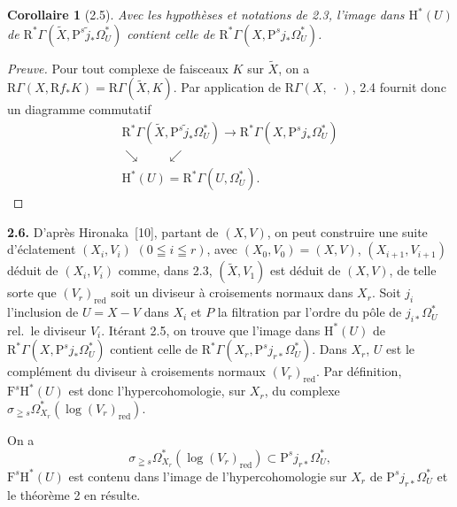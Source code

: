 \documentclass[12pt,a4paper]{article}
\theoremstyle{plain}
\newtheorem{corollary}[theorem]{Corollaire}
\theoremstyle{definition}
\begin{document}
\begin{corollary}[2.5]
Avec les hypothèses et notations de \emph{2.3}, l'image dans $\mathrm{H}^*(U)$ de $\mathrm{R}^*\Gamma(\tilde{X}, \mathrm{P}^s \tilde{j}_* \Omega_U^*)$ contient celle de $\mathrm{R}^*\Gamma(X, \mathrm{P}^s j_* \Omega_U^*)$.
\end{corollary}

\begin{proof}[Preuve]
Pour tout complexe de faisceaux $K$ sur $\tilde{X}$, on a $\mathrm{R}\Gamma(X, \mathrm{R}f_* K) = \mathrm{R}\Gamma(\tilde{X}, K)$. Par application de $\mathrm{R}\Gamma(X, \ \cdot\ )$, 2.4 fournit donc un diagramme commutatif
\[
\begin{array}{c}
\mathrm{R}^*\Gamma(\tilde{X}, \mathrm{P}^s \tilde{j}_* \Omega_U^*) \longrightarrow \mathrm{R}^*\Gamma(X, \mathrm{P}^s j_* \Omega_U^*) \\[6pt]
\searrow \qquad \swarrow \\[6pt]
\mathrm{H}^*(U) = \mathrm{R}^*\Gamma(U, \Omega_U^*).
\end{array}
\]
\end{proof}

\textbf{2.6.} D'après Hironaka~[10], partant de $(X, V)$, on peut construire une suite d'éclatement $(X_i, V_i)$ $(0 \leqq i \leqq r)$, avec $(X_0, V_0) = (X, V)$, $(X_{i+1}, V_{i+1})$ déduit de $(X_i, V_i)$ comme, dans 2.3, $(\tilde{X}, V_1)$ est déduit de $(X, V)$, de telle sorte que $(V_r)_{\mathrm{red}}$ soit un diviseur à croisements normaux dans $X_r$. Soit $j_i$ l'inclusion de $U = X - V$ dans $X_i$ et $P$ la filtration par l'ordre du pôle de $j_{i*} \Omega_U^*$ rel.\ le diviseur $V_i$. Itérant 2.5, on trouve que l'image dans $\mathrm{H}^*(U)$ de $\mathrm{R}^*\Gamma(X, \mathrm{P}^s j_* \Omega_U^*)$ contient celle de $\mathrm{R}^*\Gamma(X_r, \mathrm{P}^s j_{r*} \Omega_U^*)$. Dans $X_r$, $U$ est le complément du diviseur à croisements normaux $(V_r)_{\mathrm{red}}$. Par définition, $\mathrm{F}^s \mathrm{H}^*(U)$ est donc l'hypercohomologie, sur $X_r$, du complexe $\sigma_{\geqq s} \Omega_{X_r}^*(\log (V_r)_{\mathrm{red}})$.

On a
\[
\sigma_{\geqq s} \Omega_{X_r}^*(\log (V_r)_{\mathrm{red}}) \subset \mathrm{P}^s j_{r*} \Omega_U^*,
\]
$\mathrm{F}^s \mathrm{H}^*(U)$ est contenu dans l'image de l'hypercohomologie sur $X_r$ de $\mathrm{P}^s j_{r*} \Omega_U^*$ et le théorème 2 en résulte.
\end{document}
